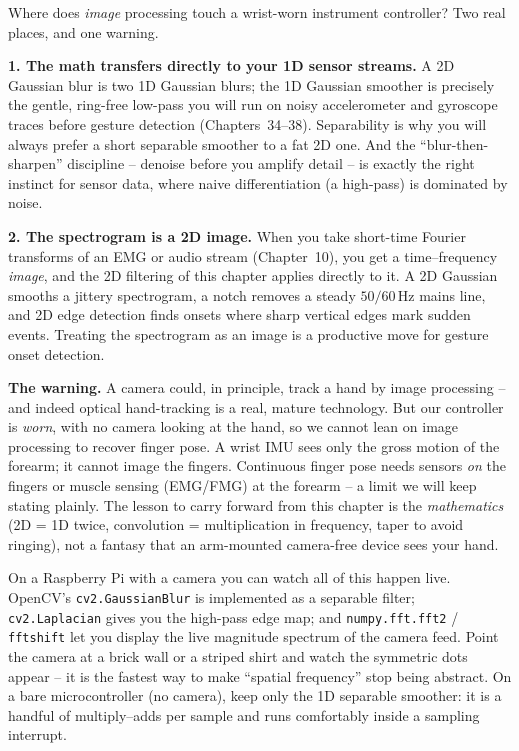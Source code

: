 \begin{goalbox}
Where does \emph{image} processing touch a wrist-worn instrument controller? Two
real places, and one warning.

\textbf{1. The math transfers directly to your 1D sensor streams.} A 2D Gaussian
blur is two 1D Gaussian blurs; the 1D Gaussian smoother is precisely the gentle,
ring-free low-pass you will run on noisy accelerometer and gyroscope traces before
gesture detection (Chapters~34--38). Separability is why you will always prefer a
short separable smoother to a fat 2D one. And the ``blur-then-sharpen'' discipline
-- denoise before you amplify detail -- is exactly the right instinct for sensor
data, where naive differentiation (a high-pass) is dominated by noise.

\textbf{2. The spectrogram is a 2D image.} When you take short-time Fourier
transforms of an EMG or audio stream (Chapter~10), you get a time--frequency
\emph{image}, and the 2D filtering of this chapter applies directly to it. A 2D Gaussian
smooths a jittery spectrogram, a notch removes a steady $50/60$\,Hz mains line, and
2D edge detection finds onsets where sharp vertical edges mark sudden events. Treating the
spectrogram as an image is a productive move for gesture onset detection.

\textbf{The warning.} A camera could, in principle, track a hand by image
processing -- and indeed optical hand-tracking is a real, mature technology. But our
controller is \emph{worn}, with no camera looking at the hand, so we cannot lean on
image processing to recover finger pose. A wrist IMU sees only the gross motion of
the forearm; it cannot image the fingers. Continuous finger pose needs sensors
\emph{on} the fingers or muscle sensing (EMG/FMG) at the forearm -- a limit we will
keep stating plainly. The lesson to carry forward from this chapter is the
\emph{mathematics} (2D = 1D twice, convolution = multiplication in frequency,
taper to avoid ringing), not a fantasy that an arm-mounted camera-free device sees
your hand.
\end{goalbox}

\begin{buildbox}
On a Raspberry Pi with a camera you can watch all of this happen live. OpenCV's
\texttt{cv2.GaussianBlur} is implemented as a separable filter; \texttt{cv2.Laplacian}
gives you the high-pass edge map; and \texttt{numpy.fft.fft2} / \texttt{fftshift}
let you display the live magnitude spectrum of the camera feed. Point the camera at
a brick wall or a striped shirt and watch the symmetric dots appear -- it is the
fastest way to make ``spatial frequency'' stop being abstract. On a bare
microcontroller (no camera), keep only the 1D separable smoother: it is a handful
of multiply--adds per sample and runs comfortably inside a sampling interrupt.
\end{buildbox}

